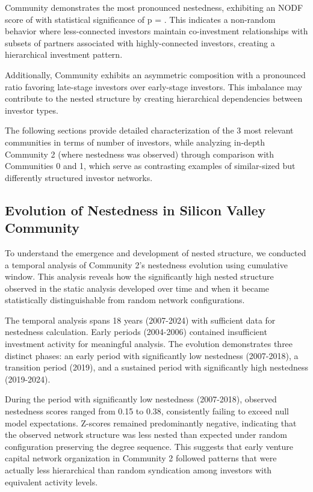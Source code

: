 Community \interestingCommunity{} demonstrates the most pronounced nestedness, exhibiting an NODF score of \interestingCommunityNODF{} with statistical significance of p = \interestingCommunityPValue{}. This indicates a non-random behavior where less-connected investors maintain co-investment relationships with subsets of partners associated with highly-connected investors, creating a hierarchical investment pattern.

Additionally, Community \interestingCommunity{} exhibits an asymmetric composition with a pronounced ratio favoring late-stage investors over early-stage investors. This imbalance may contribute to the nested structure by creating hierarchical dependencies between investor types.


The following sections provide detailed characterization of the 3 most relevant communities in terms of number of investors, while analyzing in-depth Community 2 (where nestedness was observed) through comparison with Communities 0 and 1, which serve as contrasting examples of similar-sized but differently structured investor networks.

\subsection{Evolution of Nestedness in Silicon Valley Community}

To understand the emergence and development of nested structure, we conducted a temporal analysis of Community 2's nestedness evolution using cumulative window. This analysis reveals how the significantly high nested structure observed in the static analysis developed over time and when it became statistically distinguishable from random network configurations.

The temporal analysis spans 18 years (2007-2024) with sufficient data for nestedness calculation. Early periods (2004-2006) contained insufficient investment activity for meaningful analysis. The evolution demonstrates three distinct phases: an early period with significantly low nestedness (2007-2018), a transition period (2019), and a sustained period with significantly high nestedness (2019-2024).

During the period with significantly low nestedness (2007-2018), observed nestedness scores ranged from 0.15 to 0.38, consistently failing to exceed null model expectations. Z-scores remained predominantly negative, indicating that the observed network structure was less nested than expected under random configuration preserving the degree sequence. This suggests that early venture capital network organization in Community 2 followed patterns that were actually less hierarchical than random syndication among investors with equivalent activity levels.

